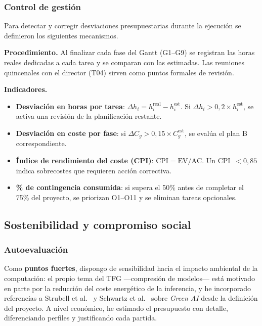 \subsubsection{Control de gestión}

Para detectar y corregir desviaciones presupuestarias durante la
ejecución se definieron los siguientes mecanismos.

\textbf{Procedimiento.} Al finalizar cada fase del Gantt (G1--G9) se
registran las horas reales dedicadas a cada tarea y se comparan con
las estimadas. Las reuniones quincenales con el director (T04) sirven
como puntos formales de revisión.

\textbf{Indicadores.}

\begin{itemize}[nosep, leftmargin=1.2em]
    \item \textbf{Desviación en horas por tarea}:
    $\Delta h_i = h_i^{\text{real}} - h_i^{\text{est}}$. Si
    $\Delta h_i > 0{,}2 \times h_i^{\text{est}}$, se activa una revisión
    de la planificación restante.
    \item \textbf{Desviación en coste por fase}: si
    $\Delta C_g > 0{,}15 \times C_g^{\text{est}}$, se evalúa el plan B
    correspondiente.
    \item \textbf{Índice de rendimiento del coste (CPI)}:
    $\text{CPI} = \text{EV}/\text{AC}$. Un CPI~$<0{,}85$ indica
    sobrecostes que requieren acción correctiva.
    \item \textbf{\% de contingencia consumida}: si supera el 50\% antes
    de completar el 75\% del proyecto, se priorizan O1--O11 y se
    eliminan tareas opcionales.
\end{itemize}


\subsection{Sostenibilidad y compromiso social}
\label{sec:gep-sostenibilidad}

\subsubsection{Autoevaluación}

Como \textbf{puntos fuertes}, dispongo de sensibilidad hacia el impacto
ambiental de la computación: el propio tema del TFG ---compresión de
modelos--- está motivado en parte por la reducción del coste energético
de la inferencia, y he incorporado referencias a Strubell et
al.~\cite{strubell2019energy} y Schwartz et al.~\cite{schwartz2020green}
sobre \emph{Green AI} desde la definición del proyecto. A nivel
económico, he estimado el presupuesto con detalle, diferenciando
perfiles y justificando cada partida.

